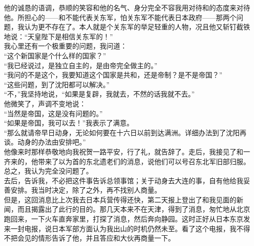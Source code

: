 他的诚恳的语调，恭顺的笑容和他的名气、身分完全不容我用对待和的态度来对待他。所担心的——和不能代表关东军，怕关东军不能代表日本政府——那两个问题，我认为更不存在了。本人就是个关东军的举足轻重的人物，况且他又斩钉截铁地说：“天皇陛下是相信关东军的！”\\

我心里还有一个极重要的问题，我问道：\\

“这个新国家是个什么样的国家？”\\

“我已经说过，是独立自主的，是由帝完全做主的。”\\

“我问的不是这个，我要知道这个国家是共和，还是帝制？是不是帝国？”\\

“这些问题，到了沈阳都可以解决。”\\

“不，”我坚持地说，“如果是复辟，我就去，不然的话我就不去。”\\

他微笑了，声调不变地说：\\

“当然是帝国，这是没有问题的。”\\

“如果是帝国，我可以去！”我表示了满意。\\

“那么就请帝早日动身，无论如何要在十六日以前到达满洲。详细办法到了沈阳再谈。动身的办法由安排吧。”\\

他像来时那样恭敬地向我祝贺一路平安，行了礼，就告辞了。走后，我接见了和一齐来的，他带来了以为首的东北遗老们的消息，说他们可以号召东北军旧部归服。总之，我认为完全没问题了。\\

去后，告诉我，不必把这件事告诉总领事馆；关于动身去大连的事，自有他给我妥善安排。我当时决定，除了之外，再不找别人商量。\\

但是，这回消息比上次我去日本兵营传得还快，第二天报上登出了和我见面的新闻，而且揭露出了此行的目的。那几天本来不在天津，得到了消息，匆忙地从北京跑回来，一下火车直奔家里，打探了消息，然后奔向静园。这时正好从日本东京发来一封电报，说日本军部方面认为我出山的时机仍然未至。看了这个电报，我不得不把会见的情形告诉了他，并且答应和大伙再商量一下。\\

